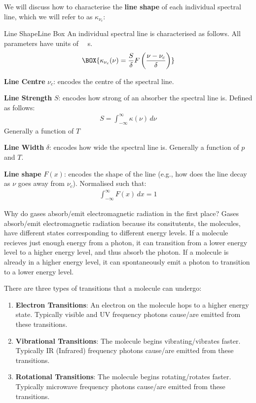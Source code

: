We will discuss how to characterise the \textbf{line shape} of each individual spectral line, which we will refer to as $\kappa_{\nu_c}$: 
\begin{fact}{Line Shape}{Line Box}\label{Line Box}
    An individual spectral line is characterised as follows. All parameters have units of \qty{}{\per\second}.
    \begin{align}
        \BOX{\kappa_{\nu_c}(\nu)=\frac{S}{\delta}F\left( \frac{\nu-\nu_c}{\delta} \right)}
    \end{align}
    \begin{minipage}{.45\linewidth}
        \textbf{Line Centre} $\nu_c$:
        encodes the centre of the spectral line.

        \vspace{5 mm}
        \textbf{Line Strength} $S$: encodes how strong of an absorber the spectral line is. Defined as follows:
        \begin{align}\label{Strength}
            S=\int_{-\infty}^{\infty}\kappa(\nu)\,d\nu
        \end{align}
        Generally a function of $T$
    \end{minipage}
    \hfill
    \begin{minipage}{.45\linewidth}
        \textbf{Line Width} $\delta$:
        encodes how wide the spectral line is. Generally a function of $p$ and $T$.
        
        \vspace{5 mm}
        \textbf{Line shape} $F(x)$: encodes the shape of the line (e.g., how does the line decay as $\nu$ goes away from $\nu_c$). Normalised such that:
        \begin{align*}
            \int_{-\infty}^{\infty}F(x)\,dx=1
        \end{align*}
    \end{minipage}
\end{fact}
Why do gases absorb/emit electromagnetic radiation in the first place? Gases absorb/emit electromagnetic radiation because its consitutents, the molecules, have different states corresponding to different energy levels. If a molecule recieves just enough energy from a photon, it can transition from a lower energy level to a higher energy level, and thus absorb the photon. If a molecule is already in a higher energy level, it can spontaneously emit a photon to transition to a lower energy level.

There are three types of transitions that a molecule can undergo:
\begin{enumerate}
    \item \textbf{Electron Transitions}: An electron on the molecule hops to a higher energy state. Typically visible and UV frequency photons cause/are emitted from these transitions.
    \item \textbf{Vibrational Transitions}: The molecule begins vibrating/vibrates faster. Typically IR (Infrared) frequency photons cause/are emitted from these transitions.
    \item \textbf{Rotational Transitions}: The molecule begins rotating/rotates faster. Typically microwave frequency photons cause/are emitted from these transitions.
\end{enumerate}

